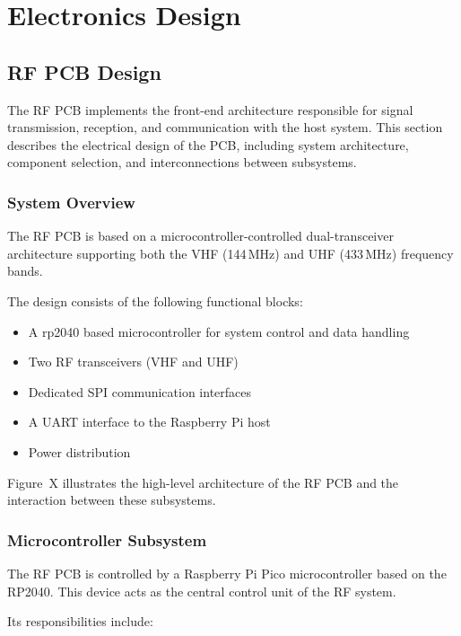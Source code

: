 \chapter{Electronics Design}
\label{ch:electronics}

\section{RF PCB Design}
\label{sec:rf_pcb}

The RF PCB implements the front-end architecture responsible for signal transmission, reception, and communication with the host system. This section describes the electrical design of the PCB, including system architecture, component selection, and interconnections between subsystems.

\subsection{System Overview}
\label{subsec:rf_system_overview}

The RF PCB is based on a microcontroller-controlled dual-transceiver architecture supporting both the VHF (144\,MHz) and UHF (433\,MHz) frequency bands.

The design consists of the following functional blocks:

\begin{itemize}
\item A rp2040 based microcontroller for system control and data handling
\item Two RF transceivers (VHF and UHF)
\item Dedicated SPI communication interfaces
\item A UART interface to the Raspberry Pi host
\item Power distribution
\end{itemize}

Figure~X illustrates the high-level architecture of the RF PCB and the interaction between these subsystems.

\subsection{Microcontroller Subsystem}
\label{subsec:rf_microcontroller}

The RF PCB is controlled by a Raspberry Pi Pico microcontroller based on the RP2040. This device acts as the central control unit of the RF system.

Its responsibilities include:

